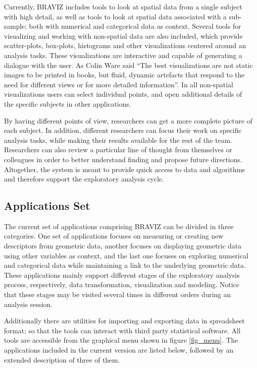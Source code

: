 \documentclass[utf8,paper]{frontiersSCNS} %
\begin{document}
Currently, BRAVIZ includes tools to look at spatial data from a single subject with high detail, as well as tools to look at spatial data associated with a sub-sample; both with numerical and categorical data as context. Several tools for visualizing and working with non-spatial data are also included, which provide scatter-plots, box-plots, histograms and other visualizations centered around an analysis tasks. These visualizations are interactive and capable of generating a dialogue with the user.
As Colin Ware \citep{ware_information_2004} said ``The best visualizations are not static images to be printed in books, but fluid, dynamic artefacts that respond to the need for different views or for more detailed information''. In all non-spatial visualizations users can select individual points, and open additional details of the specific subjects in other applications. 

By having different points of view, researchers can get a more complete picture of each subject. In addition, different researchers can focus their work on specific analysis tasks, while making their results available for the rest of the team. Researchers can also review a particular line of thought from themselves or colleagues in order to better understand finding and propose future directions. Altogether, the system is meant to provide quick access to data and algorithms and therefore support the exploratory analysis cycle. 

\subsection{Applications Set}


The current set of applications comprising BRAVIZ can be divided in three categories. One set of applications focuses on measuring or creating new descriptors from geometric data, another focuses on displaying geometric data using other variables as context, and the last one focuses on exploring numerical and categorical data while maintaining a link to the underlying geometric data. These applications mainly support different stages of the exploratory analysis process, respectively, data transformation, visualization and modeling. Notice that these stages may be visited several times in different orders during an analysis session.

Additionally there are utilities for importing and exporting data in spreadsheet format; so that the tools can interact with third party statistical software. All tools are accessible from the graphical menu shown in figure \ref{fig_menu}. The applications included in the current version are listed below, followed by an extended description of three of them.
\end{document}
